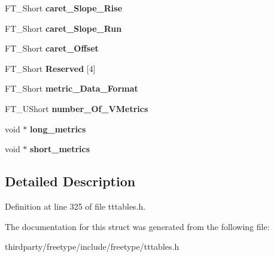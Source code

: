 \begin{DoxyCompactItemize}
\item 
\mbox{\label{struct_t_t___vert_header___a3218533a7d8ac5a8ebd70a970cbdbbcc}} 
F\+T\+\_\+\+Short {\bfseries caret\+\_\+\+Slope\+\_\+\+Rise}
\item 
\mbox{\label{struct_t_t___vert_header___a98ff91b532d827440f7140d3071d473d}} 
F\+T\+\_\+\+Short {\bfseries caret\+\_\+\+Slope\+\_\+\+Run}
\item 
\mbox{\label{struct_t_t___vert_header___a89ff9369f61dc5b770cde0eda954d402}} 
F\+T\+\_\+\+Short {\bfseries caret\+\_\+\+Offset}
\item 
\mbox{\label{struct_t_t___vert_header___a54930b56bb8be0a8eb22753a9242fc5f}} 
F\+T\+\_\+\+Short {\bfseries Reserved} \mbox{[}4\mbox{]}
\item 
\mbox{\label{struct_t_t___vert_header___aa7c3983f62f7bf736eaaaae684b65dd7}} 
F\+T\+\_\+\+Short {\bfseries metric\+\_\+\+Data\+\_\+\+Format}
\item 
\mbox{\label{struct_t_t___vert_header___a4ca6fe9cdd12fbc9a1129c4fbf6bddd1}} 
F\+T\+\_\+\+U\+Short {\bfseries number\+\_\+\+Of\+\_\+\+V\+Metrics}
\item 
\mbox{\label{struct_t_t___vert_header___ac789245d0d6243bc965ad43702bdc671}} 
void $\ast$ {\bfseries long\+\_\+metrics}
\item 
\mbox{\label{struct_t_t___vert_header___ad5e875c19a02b0f6777db1c122bff2f3}} 
void $\ast$ {\bfseries short\+\_\+metrics}
\end{DoxyCompactItemize}


\subsection{Detailed Description}


Definition at line 325 of file tttables.\+h.



The documentation for this struct was generated from the following file\+:\begin{DoxyCompactItemize}
\item 
thirdparty/freetype/include/freetype/tttables.\+h\end{DoxyCompactItemize}
